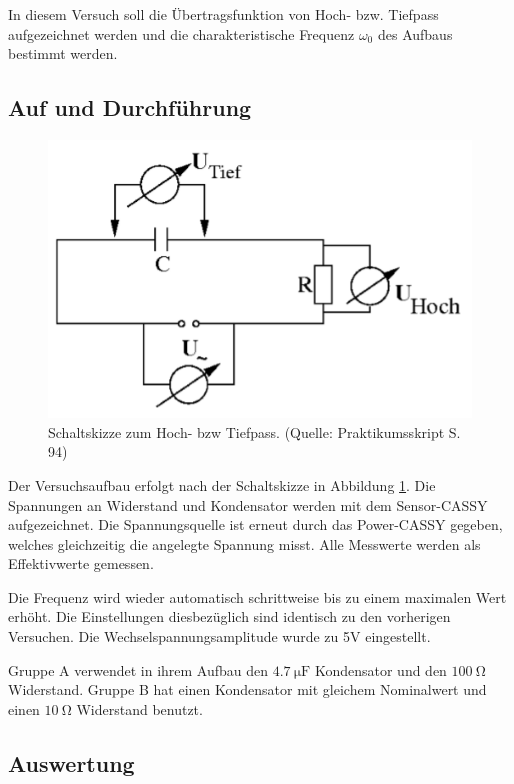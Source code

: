 \documentclass[12pt,a4paper]{article}
\begin{document}
In diesem Versuch soll die Übertragsfunktion von Hoch- bzw. Tiefpass aufgezeichnet werden und die charakteristische Frequenz $\omega_0$ des Aufbaus bestimmt werden.

\subsection{Auf und Durchführung}

\begin{figure}
\centering
\includegraphics[scale=1.0]{Bilder/AufbauHochTief.png}
\caption{Schaltskizze zum Hoch- bzw Tiefpass. (Quelle: Praktikumsskript S. 94)}
\label{fig:AufbauHochTief}
\end{figure}

Der Versuchsaufbau erfolgt nach der Schaltskizze in Abbildung \ref{fig:AufbauHochTief}. Die Spannungen an Widerstand und Kondensator
werden mit dem Sensor-CASSY aufgezeichnet. Die Spannungsquelle ist erneut durch das Power-CASSY gegeben, welches gleichzeitig die angelegte Spannung misst. Alle Messwerte werden als Effektivwerte gemessen.

Die Frequenz wird wieder automatisch schrittweise bis zu einem maximalen Wert erhöht. Die Einstellungen diesbezüglich sind identisch zu den vorherigen Versuchen. Die Wechselspannungsamplitude wurde zu 5V eingestellt.

Gruppe A verwendet in ihrem Aufbau den $\SI{4,7}{\micro \F}$ Kondensator und den $\SI{100}{\ohm}$ Widerstand. Gruppe B hat einen Kondensator mit gleichem Nominalwert und einen $\SI{10}{\ohm}$ Widerstand benutzt.

\subsection{Auswertung}
\end{document}
